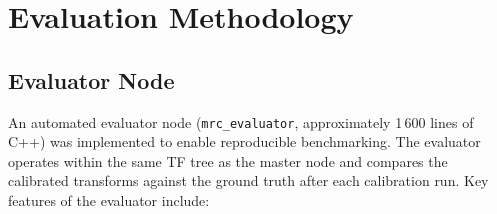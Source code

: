 \section{Evaluation Methodology}
\label{sec:evaluation_methodology}

\subsection{Evaluator Node}
\label{sec:evaluator_node}

An automated evaluator node (\texttt{mrc\_evaluator}, approximately
1\,600 lines of C++) was implemented to enable reproducible
benchmarking.
The evaluator operates within the same TF tree as the master node and
compares the calibrated transforms against the ground truth after each
calibration run.
Key features of the evaluator include:


